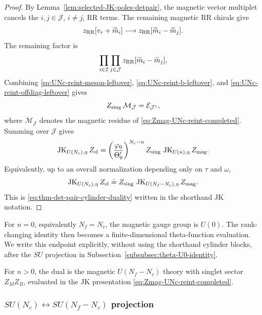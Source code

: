 \documentclass[11pt,a4paper]{article}
\numberwithin{equation}{section}
\theoremstyle{plain}
\theoremstyle{definition}
\theoremstyle{remark}
\begin{document}
\begin{proof}
By Lemma~\ref{lem:selected-JK-poles-detpair}, the magnetic vector multiplet cancels the \(i,j\in\mathcal J\), \(i\neq j\), RR terms.  The remaining magnetic RR chirals give
\begin{equation}
z_{\rm RR}[v_r+\widetilde m_i]
\longrightarrow
z_{\rm RR}[\widetilde m_i-\widetilde m_j] .
\end{equation}
The remaining factor is
\begin{equation}
\prod_{i\in\mathcal I}\prod_{j\in\mathcal J}
z_{\rm RR}[\widetilde m_i-\widetilde m_j],
\label{eq:UNc-reint-offdiag-leftover}
\end{equation}
Combining \eqref{eq:UNc-reint-meson-leftover}, \eqref{eq:UNc-reint-b-leftover}, and \eqref{eq:UNc-reint-offdiag-leftover} gives
\begin{equation}
Z_{\rm sing}\,\mathcal M_{\mathcal J}
=
\mathcal E_{\mathcal J^c},
\label{eq:UNc-reint-termwise}
\end{equation}
where \(\mathcal M_{\mathcal J}\) denotes the magnetic residue of \eqref{eq:Zmag-UNc-reint-completed}. Summing over \(\mathcal J\) gives
\begin{equation}
\operatorname{JK}_{U(N_c),\eta}Z_{\rm el}
=
\left(\frac{\varphi_0}{\Theta'_0}\right)^{N_c-n}
Z_{\rm sing}\,
\operatorname{JK}_{U(n),\eta}Z_{\rm mag}.
\label{eq:UNc-reint-final}
\end{equation}
Equivalently, up to an overall normalization depending only on \(\tau\) and \(\omega\),
\begin{equation}
\operatorname{JK}_{U(N_c),\eta}Z_{\rm el}
\doteq
Z_{\rm sing}\,
\operatorname{JK}_{U(N_f-N_c),\eta}Z_{\rm mag}.
\end{equation}
This is \eqref{eq:thm-det-pair-cylinder-duality} written in the shorthand JK notation.
\end{proof}

For \(n=0\), equivalently \(N_f=N_c\), the magnetic gauge group is \(U(0)\).  The rank-changing identity then becomes a finite-dimensional theta-function evaluation.  We write this endpoint explicitly, without using the shorthand cylinder blocks, after the \(SU\) projection in Subsection~\ref{subsubsec:theta-U0-identity}.

For \(n>0\), the dual is the magnetic \(U(N_f-N_c)\) theory with singlet sector \(Z_MZ_B\), evaluated in the JK presentation \eqref{eq:Zmag-UNc-reint-completed}.

\subsubsection{\texorpdfstring{\(SU(N_c)\leftrightarrow SU(N_f-N_c)\) projection}{SU(Nc) <-> SU(Nf-Nc) projection}}
\label{subsubsec:SU-projection}
\end{document}
